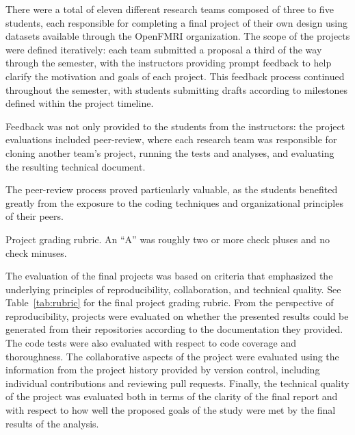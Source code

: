 There were a total of eleven different research teams composed of three
to five students, each responsible for completing a final project of their
own design using datasets available through the OpenFMRI organization.
The scope of the projects were defined iteratively: each team submitted a 
proposal a third of the way through the semester, with the instructors providing
prompt feedback to help clarify the motivation and goals of each project.
This feedback process continued throughout the semester, with students 
submitting drafts according to milestones defined within the project
timeline.

Feedback was not only provided to the students from the instructors: the
project evaluations included peer-review, where each research team was
responsible for cloning another team's project, running the tests and analyses,
and evaluating the resulting technical document.


The peer-review process proved particularly valuable, as the students 
benefited greatly from the exposure to the coding techniques and 
organizational principles of their peers.


\begin{table}
\centering
\begin{tiny}

\caption{Project grading rubric.
An ``A'' was roughly two or more check pluses and no check minuses.}
\label{tab:rubric}
\end{tiny}
\end{table}

The evaluation of the final projects was based on criteria that emphasized the
underlying principles of reproducibility, collaboration, and technical
quality.
See Table~\ref{tab:rubric} for the final project grading rubric.
From the perspective of reproducibility, projects were evaluated on whether the
presented results could be generated from their repositories according to the
documentation they provided.
The code tests were also evaluated with respect to code coverage
and thoroughness.
The collaborative aspects of the project were evaluated using the information
from the project history provided by version control, including
individual contributions and reviewing pull requests.
Finally, the technical quality of the project was evaluated both in terms of
the clarity of the final report and with respect to how well the proposed
goals of the study were met by the final results of the analysis.

